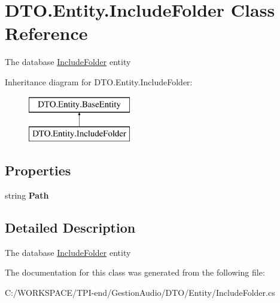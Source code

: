 \hypertarget{class_d_t_o_1_1_entity_1_1_include_folder}{}\section{D\+T\+O.\+Entity.\+Include\+Folder Class Reference}
\label{class_d_t_o_1_1_entity_1_1_include_folder}


The database \hyperlink{class_d_t_o_1_1_entity_1_1_include_folder}{Include\+Folder} entity  


Inheritance diagram for D\+T\+O.\+Entity.\+Include\+Folder\+:\begin{figure}[H]
\begin{center}
\leavevmode
\includegraphics[height=2.000000cm]{class_d_t_o_1_1_entity_1_1_include_folder}
\end{center}
\end{figure}
\subsection*{Properties}
\begin{DoxyCompactItemize}
\item 
\mbox{\label{class_d_t_o_1_1_entity_1_1_include_folder_a4a850b2a89d19e558bc14e224ad3c756}} 
string {\bfseries Path}
\end{DoxyCompactItemize}


\subsection{Detailed Description}
The database \hyperlink{class_d_t_o_1_1_entity_1_1_include_folder}{Include\+Folder} entity 



The documentation for this class was generated from the following file\+:\begin{DoxyCompactItemize}
\item 
C\+:/\+W\+O\+R\+K\+S\+P\+A\+C\+E/\+T\+P\+I-\/end/\+Gestion\+Audio/\+D\+T\+O/\+Entity/Include\+Folder.\+cs\end{DoxyCompactItemize}
